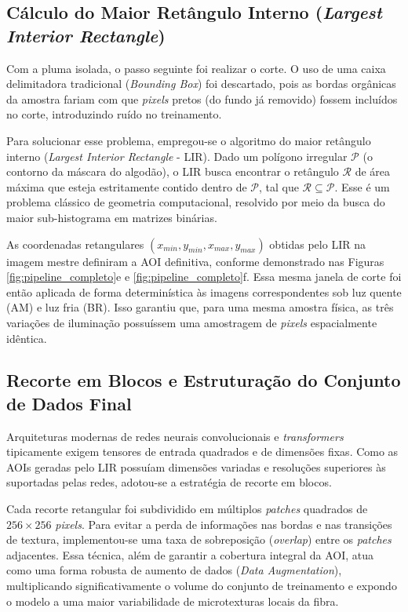\subsection{Cálculo do Maior Retângulo Interno (\textit{Largest Interior Rectangle})}
\label{sec:lir}

    Com a pluma isolada, o passo seguinte foi realizar o corte. O uso de uma caixa delimitadora tradicional (\textit{Bounding Box}) foi descartado, pois as bordas orgânicas da amostra fariam com que \textit{pixels} pretos (do fundo já removido) fossem incluídos no corte, introduzindo ruído no treinamento.

    Para solucionar esse problema, empregou-se o algoritmo do maior retângulo interno (\textit{Largest Interior Rectangle} - LIR). Dado um polígono irregular $\mathcal{P}$ (o contorno da máscara do algodão), o LIR busca encontrar o retângulo $\mathcal{R}$ de área máxima que esteja estritamente contido dentro de $\mathcal{P}$, tal que $\mathcal{R} \subseteq \mathcal{P}$. Esse é um problema clássico de geometria computacional, resolvido por meio da busca do maior sub-histograma em matrizes binárias. 
    
    As coordenadas retangulares $(x_{min}, y_{min}, x_{max}, y_{max})$ obtidas pelo LIR na imagem mestre definiram a AOI definitiva, conforme demonstrado nas Figuras \ref{fig:pipeline_completo}e e \ref{fig:pipeline_completo}f. Essa mesma janela de corte foi então aplicada de forma determinística às imagens correspondentes sob luz quente (AM) e luz fria (BR). Isso garantiu que, para uma mesma amostra física, as três variações de iluminação possuíssem uma amostragem de \textit{pixels} espacialmente idêntica.

\subsection{Recorte em Blocos e Estruturação do Conjunto de Dados Final}

    Arquiteturas modernas de redes neurais convolucionais e \textit{transformers} tipicamente exigem tensores de entrada quadrados e de dimensões fixas. Como as AOIs geradas pelo LIR possuíam dimensões variadas e resoluções superiores às suportadas pelas redes, adotou-se a estratégia de recorte em blocos.

    Cada recorte retangular foi subdividido em múltiplos \textit{patches} quadrados de $256 \times 256$ \textit{pixels}. Para evitar a perda de informações nas bordas e nas transições de textura, implementou-se uma taxa de sobreposição (\textit{overlap}) entre os \textit{patches} adjacentes. Essa técnica, além de garantir a cobertura integral da AOI, atua como uma forma robusta de aumento de dados (\textit{Data Augmentation}), multiplicando significativamente o volume do conjunto de treinamento e expondo o modelo a uma maior variabilidade de microtexturas locais da fibra.

